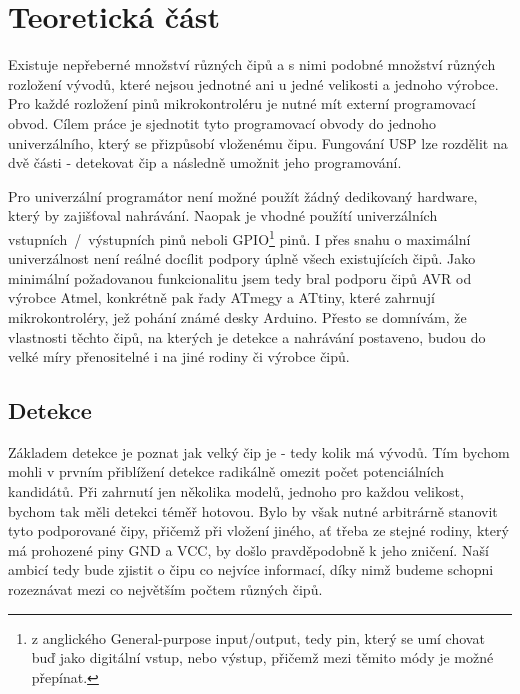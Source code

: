 \documentclass[11pt,a4paper,twoside,openright]{report}
\begin{document}


\setcounter{tocdepth}{2}
\tableofcontents

\chapter{Teoretická část}
\pagestyle{fancy}

Existuje nepřeberné množství různých čipů a s nimi podobné množství různých rozložení vývodů, které nejsou jednotné ani u jedné velikosti a jednoho výrobce. Pro každé rozložení pinů mikrokontroléru je nutné mít externí programovací obvod. Cílem práce je sjednotit tyto programovací obvody do jednoho univerzálního, který se přizpůsobí vloženému čipu. Fungování USP lze rozdělit na dvě části - detekovat čip a následně umožnit jeho programování. 

Pro univerzální programátor není možné použít žádný dedikovaný hardware, který by zajišťoval nahrávání. Naopak je vhodné použítí univerzálních vstupních~/~výstupních pinů neboli GPIO\footnote{z anglického General-purpose input/output, tedy pin, který se umí chovat buď jako digitální vstup, nebo výstup, přičemž mezi těmito módy je možné přepínat.} pinů. I přes snahu o maximální univerzálnost není reálné docílit podpory úplně všech existujících čipů. Jako minimální požadovanou funkcionalitu jsem tedy bral podporu čipů AVR od výrobce Atmel, konkrétně pak řady ATmegy a ATtiny, které zahrnují mikrokontroléry, jež pohání známé desky Arduino. Přesto se domnívám, že vlastnosti těchto čipů, na kterých je detekce a nahrávání postaveno, budou do velké míry přenositelné i na jiné rodiny či výrobce čipů.

\section{Detekce}

Základem detekce je poznat jak velký čip je - tedy kolik má vývodů. Tím bychom mohli v prvním přiblížení detekce radikálně omezit počet potenciálních kandidátů. Při zahrnutí jen několika modelů, jednoho pro každou velikost, bychom tak měli detekci téměř hotovou. Bylo by však nutné arbitrárně stanovit tyto podporované čipy, přičemž při vložení jiného, ať třeba ze stejné rodiny, který má prohozené piny GND a VCC, by došlo pravděpodobně k jeho zničení. Naší ambicí tedy bude zjistit o čipu co nejvíce informací, díky nimž budeme schopni rozeznávat mezi co největším počtem různých čipů.
\end{document}
